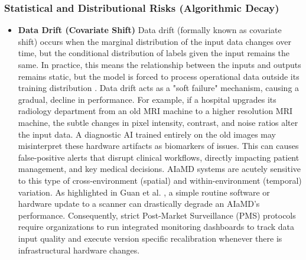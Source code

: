 \documentclass[11pt,a4paper]{article}
\begin{document}
\subsubsection{Statistical and Distributional Risks (Algorithmic Decay)}
\label{sec:Statistical and Distributional Risks (algorithmic Decay)}
\begin{itemize}
    \item \textbf{Data Drift (Covariate Shift)}
Data drift (formally known as covariate shift) occurs when the marginal distribution of the input data changes over time, but the conditional distribution of labels given the input remains the same. In practice, this means the relationship between the inputs and outputs remains static, but the model is forced to process operational data outside its training distribution \cite{kothari2019} .
Data drift acts as a "soft failure" mechanism, causing a gradual, decline in performance. For example, if a hospital upgrades its radiology department from an old MRI machine to a higher resolution MRI machine, the subtle changes in pixel intensity, contrast, and noise ratios alter the input data. A diagnostic AI trained entirely on the old images may misinterpret these hardware artifacts as biomarkers of issues. This can causes false-positive alerts that disrupt clinical workflows, directly impacting patient management, and key medical decisions. 
AIaMD systems are acutely sensitive to this type of cross-environment (spatial) and within-environment (temporal) variation. As highlighted in Guan et al.\cite{guan2026} , a simple routine software or hardware update to a scanner can drastically degrade an AIaMD's performance. Consequently, strict Post-Market Surveillance (PMS) protocols require organizations to run integrated monitoring dashboards to track data input quality and execute version specific recalibration whenever there is infrastructural hardware changes.



\end{itemize}
\end{document}
